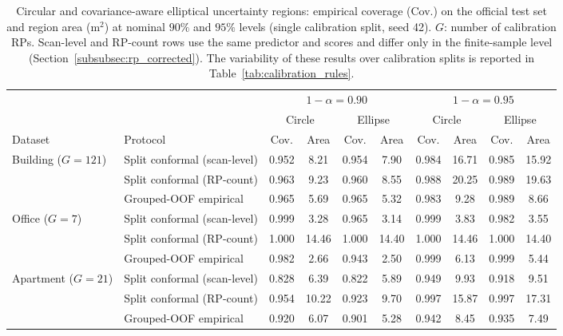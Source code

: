 \begin{table}[!t]
\centering
\caption{Circular and covariance-aware elliptical uncertainty regions: empirical coverage (Cov.) on the official test set and region area (m$^2$) at nominal $90\%$ and $95\%$ levels (single calibration split, seed 42). $G$: number of calibration RPs. Scan-level and RP-count rows use the same predictor and scores and differ only in the finite-sample level (Section~\ref{subsubsec:rp_corrected}). The variability of these results over calibration splits is reported in Table~\ref{tab:calibration_rules}.}
\label{tab:uncertainty}
\footnotesize
\setlength{\tabcolsep}{4pt}
\begin{tabular}{llcccccccc}
\toprule
 & & \multicolumn{4}{c}{$1-\alpha=0.90$} & \multicolumn{4}{c}{$1-\alpha=0.95$} \\
\cmidrule(lr){3-6}\cmidrule(lr){7-10}
 & & \multicolumn{2}{c}{Circle} & \multicolumn{2}{c}{Ellipse} & \multicolumn{2}{c}{Circle} & \multicolumn{2}{c}{Ellipse} \\
\cmidrule(lr){3-4}\cmidrule(lr){5-6}\cmidrule(lr){7-8}\cmidrule(lr){9-10}
Dataset & Protocol & Cov. & Area & Cov. & Area & Cov. & Area & Cov. & Area \\
\midrule
Building ($G=121$) & Split conformal (scan-level) & 0.952 & 8.21 & 0.954 & 7.90 & 0.984 & 16.71 & 0.985 & 15.92 \\
 & Split conformal (RP-count) & 0.963 & 9.23 & 0.960 & 8.55 & 0.988 & 20.25 & 0.989 & 19.63 \\
 & Grouped-OOF empirical & 0.965 & 5.69 & 0.965 & 5.32 & 0.983 & 9.28 & 0.989 & 8.66 \\
\midrule
Office ($G=7$) & Split conformal (scan-level) & 0.999 & 3.28 & 0.965 & 3.14 & 0.999 & 3.83 & 0.982 & 3.55 \\
 & Split conformal (RP-count) & 1.000 & 14.46 & 1.000 & 14.40 & 1.000 & 14.46 & 1.000 & 14.40 \\
 & Grouped-OOF empirical & 0.982 & 2.66 & 0.943 & 2.50 & 0.999 & 6.13 & 0.999 & 5.44 \\
\midrule
Apartment ($G=21$) & Split conformal (scan-level) & 0.828 & 6.39 & 0.822 & 5.89 & 0.949 & 9.93 & 0.918 & 9.51 \\
 & Split conformal (RP-count) & 0.954 & 10.22 & 0.923 & 9.70 & 0.997 & 15.87 & 0.997 & 17.31 \\
 & Grouped-OOF empirical & 0.920 & 6.07 & 0.901 & 5.28 & 0.942 & 8.45 & 0.935 & 7.49 \\
\bottomrule
\end{tabular}
\end{table}
